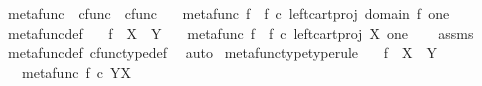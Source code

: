 \begin{isabellebody}
{\isafoldproof}%
%
\isadelimproof
%
\endisadelimproof
%
\isadelimdocument
%
\endisadelimdocument
%
\isatagdocument
%
\isamarkuptrue%
%
\isamarkuptrue%
%
\endisatagdocument
{\isafolddocument}%
%
\isadelimdocument
%
\endisadelimdocument
{}\isamarkupfalse%
\ metafunc\ {\isacharcolon}{\kern0pt}{\isacharcolon}{\kern0pt}\ {\isachardoublequoteopen}cfunc\ {\isasymRightarrow}\ cfunc{\isachardoublequoteclose}\ \isanewline
\ \ {\isachardoublequoteopen}metafunc\ f\ {\isasymequiv}\ {\isacharparenleft}{\kern0pt}f\ {\isasymcirc}\isactrlsub c\ {\isacharparenleft}{\kern0pt}left{\isacharunderscore}{\kern0pt}cart{\isacharunderscore}{\kern0pt}proj\ {\isacharparenleft}{\kern0pt}domain\ f{\isacharparenright}{\kern0pt}\ one{\isacharparenright}{\kern0pt}{\isacharparenright}{\kern0pt}\isactrlsup {\isasymsharp}{\isachardoublequoteclose}\isanewline
\isanewline
{}\isamarkupfalse%
\ metafunc{\isacharunderscore}{\kern0pt}def{}{\isacharcolon}{\kern0pt}\isanewline
\ \ \ {\isachardoublequoteopen}f\ {\isacharcolon}{\kern0pt}\ X\ {\isasymrightarrow}\ Y{\isachardoublequoteclose}\isanewline
\ \ \ {\isachardoublequoteopen}metafunc\ f\ {\isacharequal}{\kern0pt}\ {\isacharparenleft}{\kern0pt}f\ {\isasymcirc}\isactrlsub c\ {\isacharparenleft}{\kern0pt}left{\isacharunderscore}{\kern0pt}cart{\isacharunderscore}{\kern0pt}proj\ X\ one{\isacharparenright}{\kern0pt}{\isacharparenright}{\kern0pt}\isactrlsup {\isasymsharp}{\isachardoublequoteclose}\isanewline
%
\isadelimproof
\ \ %
\endisadelimproof
%
\isatagproof
{}\isamarkupfalse%
\ assms\ \isamarkupfalse%
\ metafunc{\isacharunderscore}{\kern0pt}def\ cfunc{\isacharunderscore}{\kern0pt}type{\isacharunderscore}{\kern0pt}def\ \isamarkupfalse%
\ auto%
\endisatagproof
{\isafoldproof}%
%
\isadelimproof
\isanewline
%
\endisadelimproof
\isanewline
{}\isamarkupfalse%
\ metafunc{\isacharunderscore}{\kern0pt}type{\isacharbrackleft}{\kern0pt}type{\isacharunderscore}{\kern0pt}rule{\isacharbrackright}{\kern0pt}{\isacharcolon}{\kern0pt}\isanewline
\ \ \ {\isachardoublequoteopen}f\ {\isacharcolon}{\kern0pt}\ X\ {\isasymrightarrow}\ Y{\isachardoublequoteclose}\isanewline
\ \ \ {\isachardoublequoteopen}metafunc\ f\ {\isasymin}\isactrlsub c\ Y\isactrlbsup X\isactrlesup {\isachardoublequoteclose}\isanewline
%
\isadelimproof
\ \ %
\endisadelimproof
%
\isatagproof

\end{isabellebody}
